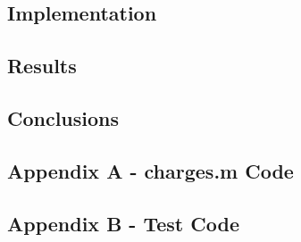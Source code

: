 \documentclass[10pt]{article}
\begin{document}
\subsection*{Implementation}


\pagebreak

\subsection*{Results}


\pagebreak

\subsection*{Conclusions}


\pagebreak

\subsection*{Appendix A - charges.m Code}


\pagebreak

\subsection*{Appendix B - Test Code}


\pagebreak
\end{document}
